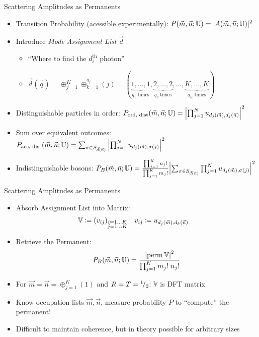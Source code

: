\begin{frame}{Scattering Amplitudes as Permanents}
%
\begin{itemize}
\item Transition Probability (acessible experimentally):
	$P(\vec{m}, \vec{n}; \mathbb{U}) = |A(\vec{m}, \vec{n}; \mathbb{U})|^2$
\item Introduce \emph{Mode Assignment List} $\vec{d}$
	\begin{itemize}
	\item \enquote{Where to find the $d_i^{\text{th}}$ photon}
	\item 
		$\vec{d}(\vec{q}) = \oplus_{j=1}^{K} \oplus_{k=1}^{q_j}(j)
		= (
			\underbrace{1, \ldots, 1}_{q_1\;\text{times}},
			\underbrace{2, \ldots, 2}_{q_2\;\text{times}}, 
			\ldots, 
			\underbrace{K, \ldots, K}_{q_K\;\text{times}}
		  )$
	\end{itemize}
\item Distinguishable particles in order:
	\tabto{1.6cm}
	$P_{\text{ord, dist}}(\vec{m}, \vec{n}; \mathbb{U})
=
	\qty|
		\prod_{j=1}^N
			u_{d_j(\vec{m}), d_j(\vec{n})}
	|^2$
\item Sum over equivalent outcomes:
	\tabto{1.6cm}
	$P_{\text{acc, dist}}(\vec{m}, \vec{n}; \mathbb{U})
= 
	\sum_{\sigma \in S_{\vec{d}(\vec{n})}}
	\qty|
		\prod_{j=1}^N
			u_{d_j(\vec{m}), \sigma(j)}
	|^2$
\item Indistinguishable bosons:
	\tabto{1.6cm}
	$P_B(\vec{m}, \vec{n}; \mathbb{U})
=
	\frac
		{\prod_{j=1}^K n_j!}
		{\prod_{j=1}^K m_j!}
	\qty|
		\sum_{\sigma \in S_{\vec{d}(\vec{n})}}
		\prod_{j=1}^N
			u_{d_j(\vec{m}), \sigma(j)}
	|^2$
\end{itemize}
%
\end{frame}


\begin{frame}{Scattering Amplitudes as Permanents}
%
\begin{itemize}
\item Absorb Assignment List into Matrix:
	\begin{align*}
			\mathbb{V}
		&\coloneqq
			\qty(v_{ij})_{\substack{
				i=1 \ldots K\\
				j=1 \ldots K
			}}
		&
			v_{ij}
		&\coloneqq
			u_{d_j(\vec{m}), d_k(\vec{n})}
	\end{align*}
\item Retrieve the Permanent:
	\begin{equation*}
		P_B(\vec{m}, \vec{n}; \mathbb{U})
	=
		\frac
			{\qty|\operatorname{perm} \mathbb{V}|^2}
			{\prod_{j=1}^K m_j! \; n_j!}
	\end{equation*}
\item For $\vec{m} = \vec{n} = \oplus_{j=1}^K (1)$ and $R = T = {}^ {1} \!/_ {2}$: $\mathbb{V}$ is DFT matrix
\item[\Thus] Know occupation lists $\vec{m}, \vec{n}$, measure probability $P$ to \enquote{compute} the permanent!
\item Difficult to maintain coherence, but in theory possible for arbitrary sizes
\end{itemize}
%
\end{frame}


